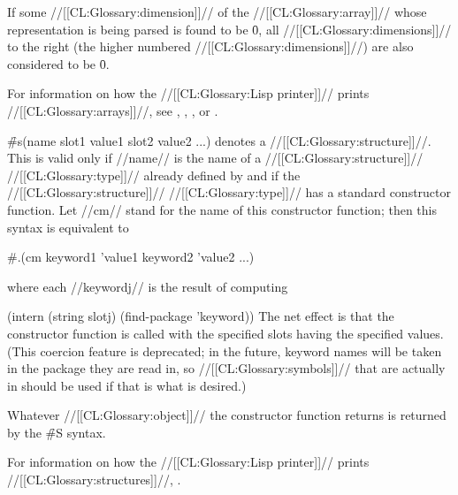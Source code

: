 If some //[[CL:Glossary:dimension]]// of the //[[CL:Glossary:array]]// whose representation is being parsed is found to be \f{0}, all //[[CL:Glossary:dimensions]]// to the right  (\ie the higher numbered //[[CL:Glossary:dimensions]]//) are also considered to be \f{0}.

For information on how the //[[CL:Glossary:Lisp printer]]// prints //[[CL:Glossary:arrays]]//, see \secref\PrintingStrings,
    \secref\PrintingBitVectors,
    \secref\PrintingOtherVectors,
 or \secref\PrintingOtherArrays.

\endsubsubsection%

  

\f{\#s(name slot1 value1 slot2 value2 ...)} denotes a //[[CL:Glossary:structure]]//.  This is valid only if //name// is the name of a //[[CL:Glossary:structure]]// //[[CL:Glossary:type]]// already defined by   and if the //[[CL:Glossary:structure]]// //[[CL:Glossary:type]]// has a standard constructor function. Let //cm// stand for the name of this constructor function; then this syntax is equivalent to

\code
 #.(cm keyword1 'value1 keyword2 'value2 ...) \endcode

where each //keywordj// is the result of computing

\code
 (intern (string slotj) (find-package 'keyword)) \endcode
     The net effect is that the constructor function is called with the specified slots having the specified values.   (This coercion feature is deprecated; in the future, keyword names will 
 be taken in the package they are read in, so //[[CL:Glossary:symbols]]// that are 
 actually in  should be used if that is what is desired.)

Whatever //[[CL:Glossary:object]]// the constructor function returns is returned by the \f{\#S} syntax.

For information on how the //[[CL:Glossary:Lisp printer]]// prints //[[CL:Glossary:structures]]//, \seesection\PrintingStructures.

\endsubsubsection%

  


